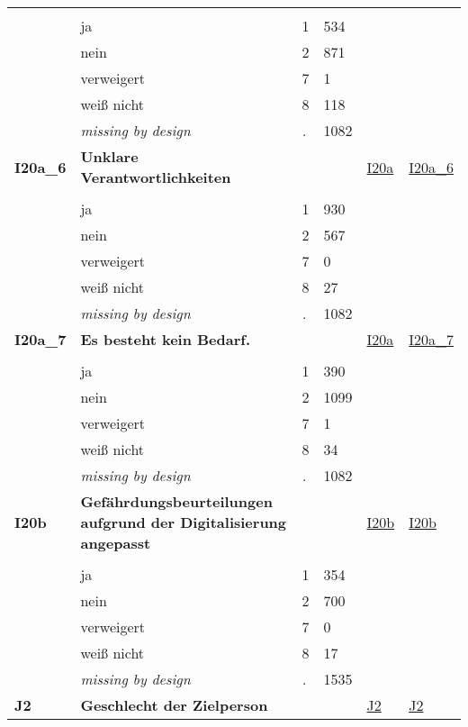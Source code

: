 \begin{longtable}{| L{2.45cm} | L{6cm} | C{1.5cm} | R{1cm} | C{2.25cm} | C{2.25cm} |}
   &  &  &  &  &  \\ 
   & ja & 1 & 534 &  &  \\ 
   & nein & 2 & 871 &  &  \\ 
   & verweigert & 7 & 1 &  &  \\ 
   & weiß nicht & 8 & 118 &  &  \\ 
   & \textit{missing by design} & \textit{.} & 1082 &  &  \\ 
   \midrule
\textbf{I20a\_6}\label{var:I20a:6} & \textbf{Unklare Verantwortlichkeiten} &  &  & \hyperref[I20a]{I20a} & \hyperref[var:suf:I20a:6]{I20a\_6} \\ 
   &  &  &  &  &  \\ 
   & ja & 1 & 930 &  &  \\ 
   & nein & 2 & 567 &  &  \\ 
   & verweigert & 7 & 0 &  &  \\ 
   & weiß nicht & 8 & 27 &  &  \\ 
   & \textit{missing by design} & \textit{.} & 1082 &  &  \\ 
   \midrule
\textbf{I20a\_7}\label{var:I20a:7} & \textbf{Es besteht kein Bedarf.} &  &  & \hyperref[I20a]{I20a} & \hyperref[var:suf:I20a:7]{I20a\_7} \\ 
   &  &  &  &  &  \\ 
   & ja & 1 & 390 &  &  \\ 
   & nein & 2 & 1099 &  &  \\ 
   & verweigert & 7 & 1 &  &  \\ 
   & weiß nicht & 8 & 34 &  &  \\ 
   & \textit{missing by design} & \textit{.} & 1082 &  &  \\ 
   \midrule
\textbf{I20b}\label{var:I20b} & \textbf{Gefährdungsbeurteilungen aufgrund der Digitalisierung angepasst} &  &  & \hyperref[I20b]{I20b} & \hyperref[var:suf:I20b]{I20b} \\ 
   &  &  &  &  &  \\ 
   & ja & 1 & 354 &  &  \\ 
   & nein & 2 & 700 &  &  \\ 
   & verweigert & 7 & 0 &  &  \\ 
   & weiß nicht & 8 & 17 &  &  \\ 
   & \textit{missing by design} & \textit{.} & 1535 &  &  \\ 
   \midrule
\textbf{J2}\label{var:J2} & \textbf{Geschlecht der Zielperson} &  &  & \hyperref[J2]{J2} & \hyperref[var:suf:J2]{J2} \\ 

\end{longtable}
